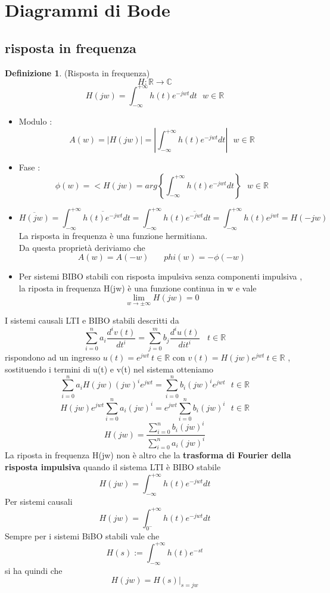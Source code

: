 \documentclass{article}
\theoremstyle{definition}
\newtheorem*{definizione}{Definizione}
\newcommand{\R}{\mathbb{R}}
\newcommand{\intinf}{\int_{-\infty}^{+\infty}}
\newcommand{\sistema}{\sum_{i=0}^{n}a_i \frac{d^i v(t)}{dt^i}=\sum_{j=0}^{m}b_j \frac{d^i u(t)}{dit^i}}
\begin{document}
\newpage
\section{Diagrammi di Bode}
\subsection{risposta in frequenza} 
\begin{definizione}(Risposta in frequenza)
	$$H: \R \to \mathbb{C}$$
	$$H(jw)=\intinf h(t)e^{-jwt}dt \ \ \  w \in \R $$
\end{definizione}
\begin{itemize}
\item Modulo : $$A(w)=|H(jw)|=\left|\intinf h(t)e^{-jwt}dt\right|\ \ \  w \in \R $$
\item Fase : $$\phi(w)=<H(jw)=arg\left\{\intinf h(t)e^{-jwt}dt\right\}\ \ \  w \in \R $$
\item $$\overline{H(jw)}=\intinf \overline{h(t)e^{-jwt}}dt = \intinf h(t)\overline{e^{-jwt}}dt = \intinf h(t)e^{jwt}=H(-jw) \ \ $$ La risposta in frequenza è una funzione hermitiana.\\Da questa proprietà deriviamo che 
$$A(w)=A(-w) \ \ \ \ \ \ \ \ phi(w)=-\phi(-w)$$
\item Per sistemi BIBO stabili con risposta impulsiva senza componenti impulsiva , la riposta in frequenza H(jw) è una funzione continua in w e vale 
$$\lim_{w \rightarrow \pm \infty }H(jw)=0$$
\end{itemize}
I sistemi causali LTI e BIBO stabili descritti da 
$$\sistema \ \ \ \ t \in \R$$ rispondono ad un ingresso $u(t)=e^{jwt} \  t \in \R$ con $v(t)=H(jw)e^{jwt} \ t \in \R$ , sostituendo i termini di u(t) e v(t) nel sistema otteniamo 
$$\sum_{i=0}^{n}a_iH(jw)(jw)^ie^{jwt}=\sum_{i=0}^{n}b_i(jw)^ie^{jwt}\ \ \ t \in \R$$
$$H(jw)e^{jwt}\sum_{i=0}^{n}a_i(jw)^i=e^{jwt}\sum_{i=0}^{n}b_i(jw)^i\ \ \ t \in \R$$ 
$$H(jw)=\frac{\sum_{i=0}^{n}b_i(jw)^i}{\sum_{i=0}^{n}a_i(jw)^i}$$
La riposta in frequenza H(jw) non è altro che la \textbf{trasforma di Fourier della risposta impulsiva} quando il sistema LTI è BIBO stabile
$$H(jw)=\intinf h(t)e^{-jwt}dt$$
Per sistemi causali 
$$H(jw)=\int_{0^-}^{+\infty} h(t)e^{-jwt}dt$$
Sempre per i sistemi BiBO stabili vale che 
$$H(s):=\intinf h(t)e^{-st}$$ si ha quindi che $$H(jw)=H(s)\big|_{s=jw}$$
\end{document}
